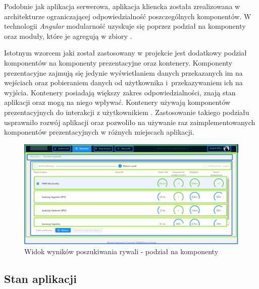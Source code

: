 Podobnie jak aplikacja serwerowa, aplikacja kliencka została zrealizowana w architekturze ograniczającej odpowiedzialność poszczególnych komponentów. W technologii \textit{Angular} modularność uzyskuje się poprzez podział na komponenty oraz moduły, które je agregują w zbiory \cite{ngarchitecture}. 

Istotnym wzorcem jaki został zastosowany w projekcie jest dodatkowy podział komponentów na komponenty prezentacyjne oraz kontenery. Komponenty prezentacyjne zajmują się jedynie wyświetlaniem danych przekazanych im na wejściach oraz pobieraniem danych od użytkownika i~przekazywaniem ich na wyjścia. Kontenery posiadają większy zakres odpowiedzialności, znają stan aplikacji oraz mogą na niego wpływać. Kontenery używają komponentów prezentacyjnych do interakcji z użytkownikiem \cite{ngcomponents}. Zastosowanie takiego podziału usprawniło rozwój aplikacji oraz pozwoliło na używanie raz zaimplementowanych komponentów prezentacyjnych w różnych miejscach aplikacji.




\begin{figure}[H]
\centering
\includegraphics[width=\linewidth]{06-implementacja/rys/modularyzacja.PNG}
\caption{Widok wyników poszukiwania rywali - podział na komponenty}
\label{fig:criterion-classes}
\end{figure}


\subsection{Stan aplikacji}

